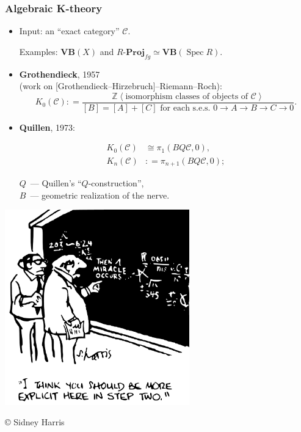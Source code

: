 \documentclass[handout]{beamer}
\newcommand{\personality}[1]{{\bf #1}}
\newcommand{\ZZ}{\mathbb{Z}}
\newcommand{\isom}{\cong}
\newcommand{\dfn}{\mathrel{\mathop:}=}
\DeclareMathOperator{\Spec}{Spec}
\begin{document}

\begin{frame}
  \frametitle{Algebraic K-theory}

  \begin{itemize}
  \item<2-> Input: an ``exact category'' $\mathcal{C}$.

    Examples: $\textbf{VB} (X)$ and $R\textbf{-Proj}_{fg} \simeq \textbf{VB} (\Spec R)$.

  \item<3-> \personality{Grothendieck}, 1957\\
    (work on [Grothendieck--Hirzebruch]--Riemann--Roch):
    $$K_0 (\mathcal{C}) \dfn \frac{\ZZ \left<\text{isomorphism classes of objects of }\mathcal{C}\right>}{[B] = [A]+[C]\text{ for each s.e.s. } 0\to A\to B\to C\to 0}.$$

  \item<4-> \personality{Quillen}, 1973:

    \begin{align*}
      K_0 (\mathcal{C}) & \isom \pi_1 (BQ\mathcal{C}, 0),\\
      K_n (\mathcal{C}) & \dfn \pi_{n+1} (BQ\mathcal{C}, 0);
    \end{align*}

    $Q$~--- Quillen's ``$Q$-construction'',\\
    $B$~--- geometric realization of the nerve.
  \end{itemize}
\end{frame}


\begin{frame}
  \begin{center}
    \includegraphics[width=8cm]{miracle.pdf}

    {\small\color[rgb]{0.6,0.6,0.6} \copyright{} Sidney Harris}
  \end{center}
\end{frame}
\end{document}
